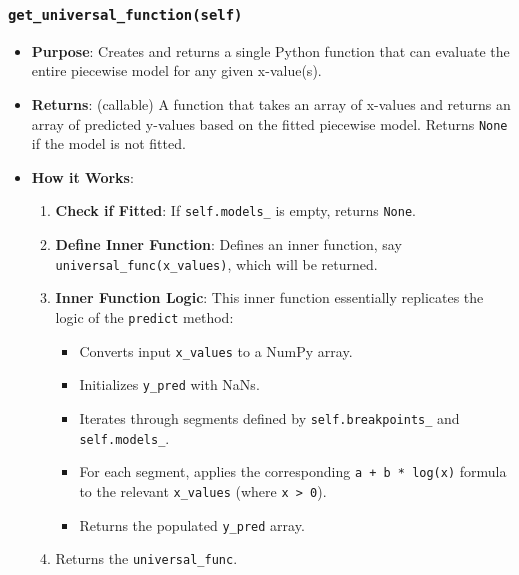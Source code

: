 \documentclass[12pt,a4paper]{report}
\begin{document}
{\subsubsection{\texttt{get\_universal\_function(self)}}
\begin{itemize}
    \item \textbf{Purpose}: Creates and returns a single Python function that can evaluate the entire piecewise model for any given x-value(s).
    \item \textbf{Returns}: (callable) A function that takes an array of x-values and returns an array of predicted y-values based on the fitted piecewise model. Returns \texttt{None} if the model is not fitted.
    \item \textbf{How it Works}:
        \begin{enumerate}
            \item \textbf{Check if Fitted}: If \texttt{self.models\_} is empty, returns \texttt{None}.
            \item \textbf{Define Inner Function}: Defines an inner function, say \texttt{universal\_func(x\_values)}, which will be returned.
            \item \textbf{Inner Function Logic}: This inner function essentially replicates the logic of the \texttt{predict} method:
                \begin{itemize}
                    \item Converts input \texttt{x\_values} to a NumPy array.
                    \item Initializes \texttt{y\_pred} with NaNs.
                    \item Iterates through segments defined by \texttt{self.breakpoints\_} and \texttt{self.models\_}.
                    \item For each segment, applies the corresponding \texttt{a + b * log(x)} formula to the relevant \texttt{x\_values} (where \texttt{x > 0}).
                    \item Returns the populated \texttt{y\_pred} array.
                \end{itemize}
            \item Returns the \texttt{universal\_func}.
        \end{enumerate}
\end{itemize}

}
\end{document}
